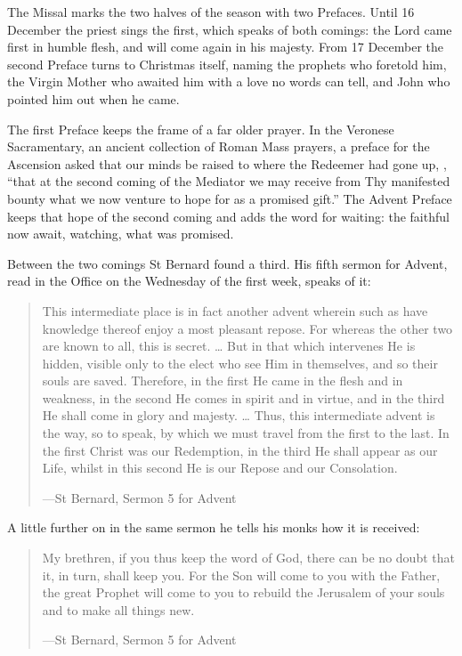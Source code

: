 The Missal marks the two halves of the season with two Prefaces. Until 16
December the priest sings the first, which speaks of both comings: the Lord came
first in humble flesh, and will come again in his majesty. From 17 December the
second Preface turns to Christmas itself, naming the prophets who foretold him,
the Virgin Mother who awaited him with a love no words can tell, and John who
pointed him out when he came.

The first Preface keeps the frame of a far older prayer. In the Veronese
Sacramentary, an ancient collection of Roman Mass prayers, a preface for the Ascension
asked that our minds be raised to where the Redeemer had gone up,
, ``that at the second coming of the Mediator we may receive
from Thy manifested bounty what we now venture to hope for as a promised
gift.'' The Advent
Preface keeps that hope of the second coming and adds the word for waiting: the
faithful now await, watching, what was promised.

Between the two comings St Bernard found a third. His fifth sermon for Advent,
read in the Office on the Wednesday of the first week, speaks of it:

\begin{quote}
This intermediate place is in fact another advent wherein such as have knowledge
thereof enjoy a most pleasant repose. For whereas the other two are known to
all, this is secret. \ldots{} But in that which intervenes He is hidden, visible
only to the elect who see Him in themselves, and so their souls are saved.
Therefore, in the first He came in the flesh and in weakness, in the second He
comes in spirit and in virtue, and in the third He shall come in glory and
majesty. \ldots{} Thus, this intermediate advent is the way, so to speak, by
which we must travel from the first to the last. In the first Christ was our
Redemption, in the third He shall appear as our Life, whilst in this second He
is our Repose and our Consolation.\par
{\smallskip\noindent\small ---St Bernard, Sermon 5 for Advent\par}
\end{quote}

\noindent A little further on in the same sermon he tells his monks how it is
received:

\begin{quote}
My brethren, if you thus keep the word of God, there can be no doubt that it, in
turn, shall keep you. For the Son will come to you with the Father, the great
Prophet will come to you to rebuild the Jerusalem of your souls and to make all
things new.\par
{\smallskip\noindent\small ---St Bernard, Sermon 5 for Advent\par}
\end{quote}

